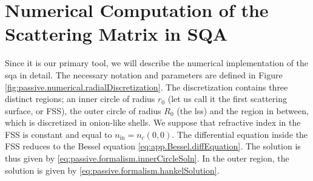 \section{Numerical Computation of the Scattering Matrix in SQA}\label{sec:app.numTools.scatMat}
Since it is our primary tool, we will describe the numerical implementation
of the \gls{sqa} in detail. The necessary notation and parameters are defined in 
Figure \ref{fig:passive.numerical.radialDiscretization}. The discretization
contains three distinct regions; an inner circle of radius $r_0$ (let us call it
the first scattering surface, or FSS), the outer circle of radius $R_0$ (the \gls{lss})
and the region in between, which is discretized in onion-like shells. We suppose
that refractive index in the FSS is constant and equal to $n_\text{in}=n_c(0,0)$. 
The differential equation inside the FSS reduces to the Bessel equation 
\eqref{eq:app.Bessel.diffEquation}. The solution is thus given by 
\eqref{eq:passive.formalism.innerCircleSoln}. In the outer region, the solution
is given by \eqref{eq:passive.formalism.hankelSolution}. 

